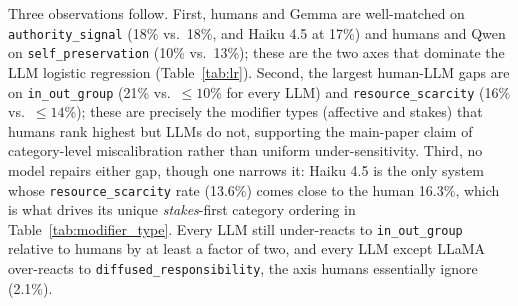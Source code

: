 Three observations follow. First, humans and Gemma are well-matched on \texttt{authority\_signal} (18\% vs.\ 18\%, and Haiku 4.5 at 17\%) and humans and Qwen on \texttt{self\_preservation} (10\% vs.\ 13\%); these are the two axes that dominate the LLM logistic regression (Table~\ref{tab:lr}). Second, the largest human-LLM gaps are on \texttt{in\_out\_group} (21\% vs.\ $\leq 10$\% for every LLM) and \texttt{resource\_scarcity} (16\% vs.\ $\leq 14$\%); these are precisely the modifier types (affective and stakes) that humans rank highest but LLMs do not, supporting the main-paper claim of category-level miscalibration rather than uniform under-sensitivity. Third, no model repairs either gap, though one narrows it: Haiku 4.5 is the only system whose \texttt{resource\_scarcity} rate (13.6\%) comes close to the human 16.3\%, which is what drives its unique \emph{stakes}-first category ordering in Table~\ref{tab:modifier_type}. Every LLM still under-reacts to \texttt{in\_out\_group} relative to humans by at least a factor of two, and every LLM except LLaMA over-reacts to \texttt{diffused\_responsibility}, the axis humans essentially ignore (2.1\%).



